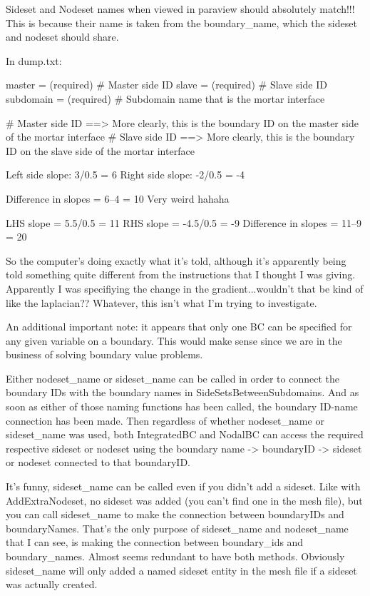 Sideset and Nodeset names when viewed in paraview should absolutely match!!! This is because their name is taken from the boundary_name, which the sideset and nodeset should share.

In dump.txt:

      master                     = (required)                  # Master side ID
      slave                      = (required)                  # Slave side ID
      subdomain                  = (required)                  # Subdomain name that is the mortar interface

# Master side ID ==> More clearly, this is the boundary ID on the master side of the mortar interface
# Slave side ID ==> More clearly, this is the boundary ID on the slave side of the mortar interface

Left side slope: 3/0.5 = 6
Right side slope: -2/0.5 = -4

Difference in slopes = 6--4 = 10
Very weird hahaha

LHS slope = 5.5/0.5 = 11
RHS slope = -4.5/0.5 = -9
Difference in slopes = 11--9 = 20

So the computer's doing exactly what it's told, although it's apparently being told something quite different from the instructions that I thought I was giving. Apparently I was specifiying the change in the gradient...wouldn't that be kind of like the laplacian?? Whatever, this isn't what I'm trying to investigate.

An additional important note: it appears that only one BC can be specified for any given variable on a boundary. This would make sense since we are in the business of solving boundary value problems.

Either nodeset_name or sideset_name can be called in order to connect the boundary IDs with the boundary names in SideSetsBetweenSubdomains. And as soon as either of those naming functions has been called, the boundary ID-name connection has been made. Then regardless of whether nodeset_name or sideset_name was used, both IntegratedBC and NodalBC can access the required respective sideset or nodeset using the boundary name -> boundaryID -> sideset or nodeset connected to that boundaryID.

It's funny, sideset_name can be called even if you didn't add a sideset. Like with AddExtraNodeset, no sideset was added (you can't find one in the mesh file), but you can call sideset_name to make the connection between boundaryIDs and boundaryNames. That's the only purpose of sideset_name and nodeset_name that I can see, is making the connection between boundary_ids and boundary_names. Almost seems redundant to have both methods. Obviously sideset_name will only added a named sideset entity in the mesh file if a sideset was actually created.

